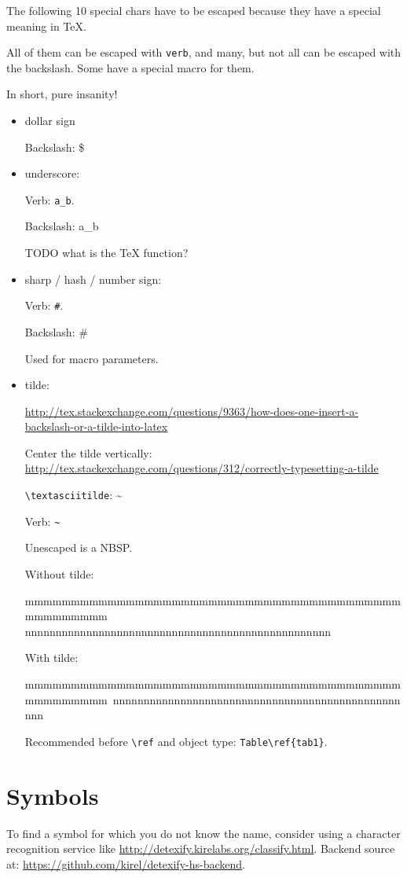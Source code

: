 \documentclass[12pt]{article}
\begin{document}
The following 10 special chars have to be escaped because they have a special meaning in TeX.

All of them can be escaped with \lstinline|verb|, and many, but not all can be escaped with the backslash. Some have a special macro for them.

In short, pure insanity!

\begin{itemize}
\item dollar sign

Backslash: \$

\item underscore:

Verb: \verb|a_b|.

Backslash: a\_b

TODO what is the TeX function?

\item sharp / hash / number sign:

Verb: \verb|#|.

Backslash: \#

Used for macro parameters.

\item tilde:

\url{http://tex.stackexchange.com/questions/9363/how-does-one-insert-a-backslash-or-a-tilde-into-latex}

Center the tilde vertically: \url{http://tex.stackexchange.com/questions/312/correctly-typesetting-a-tilde}

\lstinline|\textasciitilde|: \textasciitilde

Verb: \verb|~|

Unescaped is a NBSP.

Without tilde:

mmmmmmmmmmmmmmmmmmmmmmmmmmmmmmmmmmmmmmmmmmmmmmmmmm nnnnnnnnnnnnnnnnnnnnnnnnnnnnnnnnnnnnnnnnnnnnnnnnnn 

With tilde:

mmmmmmmmmmmmmmmmmmmmmmmmmmmmmmmmmmmmmmmmmmmmmmmmmm~nnnnnnnnnnnnnnnnnnnnnnnnnnnnnnnnnnnnnnnnnnnnnnnnnn 

Recommended before \lstinline|\ref| and object type: \lstinline|Table\ref{tab1}|.
\end{itemize}

\section{Symbols}\label{symbols}

To find a symbol for which you do not know the name,
consider using a character recognition service like \url{http://detexify.kirelabs.org/classify.html}.
Backend source at: \url{https://github.com/kirel/detexify-hs-backend}.
\end{document}
